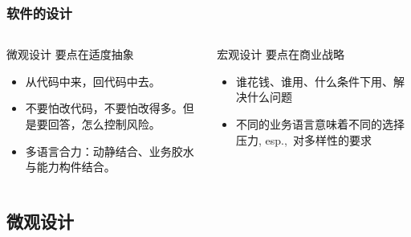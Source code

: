 \begin{frame}
    \frametitle{软件的设计}
    \begin{columns}[t]
        \begin{column}{0.45\textwidth}
            \begin{block}{微观设计}
                要点在适度抽象
                \begin{itemize}
                    \item 从代码中来，回代码中去。
                    \item 不要怕改代码，不要怕改得多。但是要回答，怎么控制风险。
                    \item 多语言合力：动静结合、业务胶水与能力构件结合。
                \end{itemize}
            \end{block}
        \end{column}
        \begin{column}{0.45\textwidth}
            \begin{block}{宏观设计}
                要点在商业战略
                \begin{itemize}
                    \item 谁花钱、谁用、什么条件下用、解决什么问题
                    \item 不同的业务语言意味着不同的选择压力, esp.,\ 对多样性的要求
                \end{itemize}
            \end{block}
        \end{column}
    \end{columns}
\end{frame}

\subsection{微观设计}

